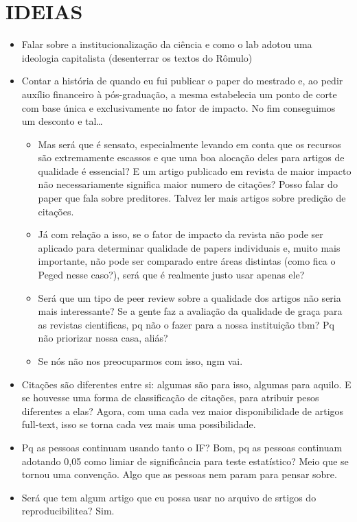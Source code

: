 \documentclass[11pt]{article}
\begin{document}
\section{IDEIAS}
\label{sec:org84b7cd7}

\begin{itemize}
\item Falar sobre a institucionalização da ciência e como o lab adotou uma ideologia capitalista (desenterrar os textos do Rômulo)
\item Contar a história de quando eu fui publicar o paper do mestrado e, ao pedir auxílio financeiro à pós-graduação, a mesma estabelecia um ponto de corte com base única e exclusivamente no fator de impacto. No fim conseguimos um desconto e tal\ldots{}
\begin{itemize}
\item Mas será que é sensato, especialmente levando em conta que os recursos são extremamente escassos e que uma boa alocação deles para artigos de qualidade é essencial? E um artigo publicado em revista de maior impacto não necessariamente significa maior numero de citações? Posso falar do paper que fala sobre preditores. Talvez ler mais artigos sobre predição de citações.
\item Já com relação a isso, se o fator de impacto da revista não pode ser aplicado para determinar qualidade de papers individuais e, muito mais importante, não pode ser comparado entre áreas distintas (como fica o Peged nesse caso?), será que é realmente justo usar apenas ele?
\item Será que um tipo de peer review sobre a qualidade dos artigos não seria mais interessante? Se a gente faz a avaliação da qualidade de graça para as revistas cientificas, pq não o fazer para a nossa instituição tbm? Pq não priorizar nossa casa, aliás?
\item Se nós não nos preocuparmos com isso, ngm vai.
\end{itemize}
\item Citações são diferentes entre si: algumas são para isso, algumas para aquilo. E se houvesse uma forma de classificação de citações, para atribuir pesos diferentes a elas? Agora, com uma cada vez maior disponibilidade de artigos full-text, isso se torna cada vez mais uma possibilidade.
\item Pq as pessoas continuam usando tanto o IF? Bom, pq as pessoas continuam adotando 0,05 como limiar de significância para teste estatístico? Meio que se tornou uma convenção. Algo que as pessoas nem param para pensar sobre.
\item Será que tem algum artigo que eu possa usar no arquivo de srtigos do reproducibilitea? Sim.

\end{itemize}
\end{document}
